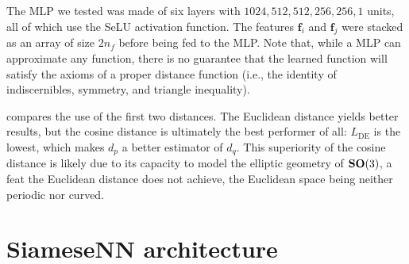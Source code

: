 The MLP we tested was made of six layers with $1024, 512, 512, 256, 256, 1$ units, all of which use the SeLU activation function. The features $\mathbf{f}_i$ and $\mathbf{f}_j$ were stacked as an array of size $2n_f$ before being fed to the MLP\@. Note that, while a MLP can approximate any function, there is no guarantee that the learned function will satisfy the axioms of a proper distance function (i.e., the identity of indiscernibles, symmetry, and triangle inequality). 

 compares the use of the first two distances. The Euclidean distance yields better results, but the cosine distance is ultimately the best performer of all: $L_\text{DE}$ is the lowest, which makes $d_p$ a better estimator of $d_q$.
This superiority of the cosine distance is likely due to its capacity to model the elliptic geometry of $\mathrm{\mathbf{SO}}(3)$, a feat the Euclidean distance does not achieve, the Euclidean space being neither periodic nor curved.

\clearpage
\section{SiameseNN architecture}\label{apx:siamese-architecture}

        


